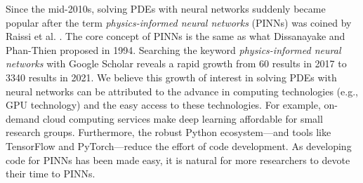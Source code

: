 Since the mid-2010s, solving PDEs with neural networks suddenly became popular after the term {\it physics-informed neural networks} (PINNs) was coined by Raissi et al. \cite{raissi_physics-informed_2017}.
The core concept of PINNs is the same as what Dissanayake and Phan-Thien proposed in 1994.
Searching the keyword {\it physics-informed neural networks} with Google Scholar reveals a rapid growth from 60 results in 2017 to \num{3340} results in 2021.
We believe this growth of interest in solving PDEs with neural networks can be attributed to the advance in computing technologies (e.g., GPU technology) and the easy access to these technologies.
For example, on-demand cloud computing services make deep learning affordable for small research groups.
Furthermore, the robust Python ecosystem---and tools like TensorFlow and PyTorch---reduce the effort of code development. 
As developing code for PINNs has been made easy, it is natural for more researchers to devote their time to PINNs.

